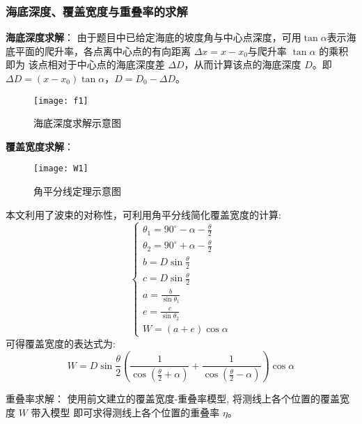 \documentclass[withoutpreface,bwprint]{cumcmthesis} %
\begin{document}
        \subsubsection{海底深度、覆盖宽度与重叠率的求解}
        \textbf{海底深度求解}：
        由于题目中已给定海底的坡度角与中心点深度，可用$\tan\alpha$表示海底平面的爬升率，各点离中心点的有向距离 $\Delta x = x - x_0$与爬升率 $\tan \alpha$ 的乘积即为
        该点相对于中心点的海底深度差 $\Delta D$，从而计算该点的海底深度 $D$。即$\Delta D = (x - x_0)\tan\alpha$，$D = D_0 - \Delta D$。
        \begin{figure}[H]
            \centering
            \texttt{[image: f1]}
            \caption{海底深度求解示意图}
            \label{fig:f1}
        \end{figure}

        \textbf{覆盖宽度求解}：
        \begin{figure}[!htbp]
            \centering
            \texttt{[image: W1]}
            \caption{角平分线定理示意图}
            \label{fig:}
        \end{figure}
        本文利用了波束的对称性，可利用角平分线简化覆盖宽度的计算:
        \begin{equation}
            \begin{cases}
                \theta_1 = 90^{\circ} - \alpha - \frac{\theta}{2} \\
                \theta_2 = 90^{\circ} + \alpha - \frac{\theta}{2} \\
                b = D\sin\frac{\theta}{2} \\
                c = D\sin\frac{\theta}{2} \\
                a = \frac{b}{\sin\theta_1} \\
                e = \frac{c}{\sin\theta_2} \\
                W = (a + e)\cos \alpha
            \end{cases}
            \label{eq:solve_over_width}
        \end{equation}
        可得覆盖宽度的表达式为:
        \begin{equation}
            W = D\sin\frac{\theta}{2}(\frac{1}{\cos(\frac{\theta}{2}+\alpha)} + \frac{1}{\cos(\frac{\theta}{2} - \alpha)})\cos\alpha
            \label{eq:over_width_1}
        \end{equation}

        重叠率求解：
        使用前文建立的覆盖宽度-重叠率模型, 将测线上各个位置的覆盖宽度 $W$ 带入模型
        即可求得测线上各个位置的重叠率 $\eta$。
\end{document}
